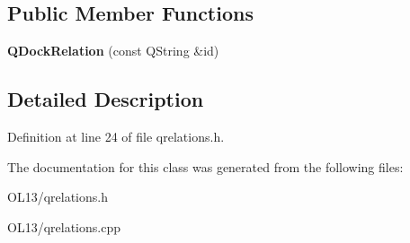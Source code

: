 \subsection*{Public Member Functions}
\begin{DoxyCompactItemize}
\item 
\mbox{\label{class_q_dock_relation_a3cef55579cbcd3a665253b62876f69dc}} 
{\bfseries Q\+Dock\+Relation} (const Q\+String \&id)
\end{DoxyCompactItemize}


\subsection{Detailed Description}


Definition at line 24 of file qrelations.\+h.



The documentation for this class was generated from the following files\+:\begin{DoxyCompactItemize}
\item 
O\+L13/qrelations.\+h\item 
O\+L13/qrelations.\+cpp\end{DoxyCompactItemize}
